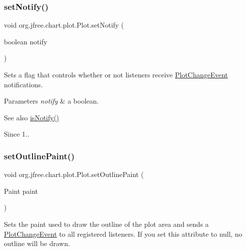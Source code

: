 \subsubsection{\texorpdfstring{set\+Notify()}{setNotify()}}
{\footnotesize\ttfamily void org.\+jfree.\+chart.\+plot.\+Plot.\+set\+Notify (\begin{DoxyParamCaption}\item[{boolean}]{notify }\end{DoxyParamCaption})}

Sets a flag that controls whether or not listeners receive \mbox{\hyperlink{}{Plot\+Change\+Event}} notifications.


\begin{DoxyParams}{Parameters}
{\em notify} & a boolean.\\
\hline
\end{DoxyParams}
\begin{DoxySeeAlso}{See also}
\mbox{\hyperlink{classorg_1_1jfree_1_1chart_1_1plot_1_1_plot_a5d051f24b95eea6ea09a1c96780c7bd1}{is\+Notify()}}
\end{DoxySeeAlso}
\begin{DoxySince}{Since}
1.. 
\end{DoxySince}
\mbox{\label{classorg_1_1jfree_1_1chart_1_1plot_1_1_plot_af93be31b03f8952fd039f33458135c8b}} 
\subsubsection{\texorpdfstring{set\+Outline\+Paint()}{setOutlinePaint()}}
{\footnotesize\ttfamily void org.\+jfree.\+chart.\+plot.\+Plot.\+set\+Outline\+Paint (\begin{DoxyParamCaption}\item[{Paint}]{paint }\end{DoxyParamCaption})}

Sets the paint used to draw the outline of the plot area and sends a \mbox{\hyperlink{}{Plot\+Change\+Event}} to all registered listeners. If you set this attribute to {\ttfamily null}, no outline will be drawn.


